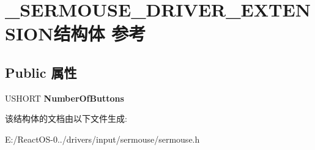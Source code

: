 \hypertarget{struct___s_e_r_m_o_u_s_e___d_r_i_v_e_r___e_x_t_e_n_s_i_o_n}{}\section{\+\_\+\+S\+E\+R\+M\+O\+U\+S\+E\+\_\+\+D\+R\+I\+V\+E\+R\+\_\+\+E\+X\+T\+E\+N\+S\+I\+O\+N结构体 参考}
\label{struct___s_e_r_m_o_u_s_e___d_r_i_v_e_r___e_x_t_e_n_s_i_o_n}
\subsection*{Public 属性}
\begin{DoxyCompactItemize}
\item 
\mbox{\label{struct___s_e_r_m_o_u_s_e___d_r_i_v_e_r___e_x_t_e_n_s_i_o_n_a53c0b43737ee918506a8a5028c1c7b59}} 
U\+S\+H\+O\+RT {\bfseries Number\+Of\+Buttons}
\end{DoxyCompactItemize}


该结构体的文档由以下文件生成\+:\begin{DoxyCompactItemize}
\item 
E\+:/\+React\+O\+S-\/0../drivers/input/sermouse/sermouse.\+h\end{DoxyCompactItemize}

